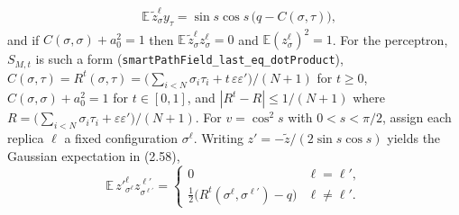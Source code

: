 \begin{lemma}
\begin{align*}
 &\mathbb E\,\tilde z^\ell_\sigma y_\tau=\sin s\cos s\,\bigl(q-C(\sigma,\tau)\bigr),
\end{align*}
and if $C(\sigma,\sigma)+a_0^2=1$ then $\mathbb E\,\tilde z^\ell_\sigma z^\ell_\sigma=0$ and $\mathbb E(z^\ell_\sigma)^2=1$. For the perceptron, $S_{M,t}$ is such a form
(\texttt{smartPathField\_last\_eq\_dotProduct}), $C(\sigma,\tau)=R^t(\sigma,\tau)=\bigl(\sum_{i<N}\sigma_i\tau_i+t\,\varepsilon\varepsilon'\bigr)/(N+1)$ for $t\ge0$,
$C(\sigma,\sigma)+a_0^2=1$ for $t\in[0,1]$, and $|R^t-R|\le1/(N+1)$ where $R=\bigl(\sum_{i<N}\sigma_i\tau_i+\varepsilon\varepsilon'\bigr)/(N+1)$.
For $v=\cos^2s$ with $0<s<\pi/2$, assign each replica $\ell$ a fixed configuration $\sigma^\ell$.
Writing $z'=-\tilde z/(2\sin s\cos s)$ yields the Gaussian expectation in (2.58),
\[
 \mathbb E\, z'^\ell_{\sigma^\ell}z^{\ell'}_{\sigma^{\ell'}}=
 \begin{cases}
 0 & \ell=\ell',\\
 \tfrac12\bigl(R^t(\sigma^\ell,\sigma^{\ell'})-q\bigr) & \ell\ne\ell'.
 \end{cases}
\]
\end{lemma}
